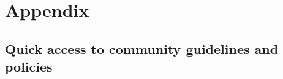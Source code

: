\documentclass{article}
\begin{document}




{}


\section{Appendix}

\subsection{Quick access to community guidelines and policies} \label{links}
\end{document}

